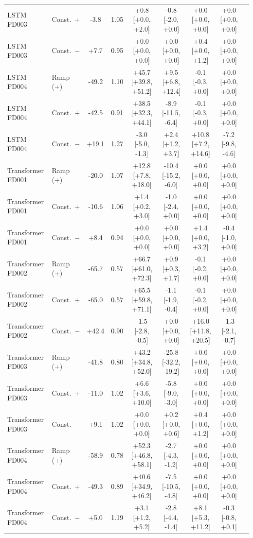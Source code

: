 \documentclass[10pt,a4paper]{article}
\begin{document}
\begin{landscape}
\begin{table}[H]
\begin{tabular}{llccccccc}
LSTM FD003 & Const.\ $+$ & -3.8 & 1.05 & +0.8 [+0.0, +2.0] & -0.8 [-2.0, +0.0] & +0.0 [+0.0, +0.0] & +0.0 [+0.0, +0.0] \\
LSTM FD003 & Const.\ $-$ & +7.7 & 0.95 & +0.0 [+0.0, +0.0] & +0.0 [+0.0, +0.0] & +0.4 [+0.0, +1.2] & +0.0 [+0.0, +0.0] \\
LSTM FD004 & Ramp (+) & -49.2 & 1.10 & +45.7 [+39.8, +51.2] & +9.5 [+6.8, +12.4] & -0.1 [-0.3, +0.0] & +0.0 [+0.0, +0.0] \\
LSTM FD004 & Const.\ $+$ & -42.5 & 0.91 & +38.5 [+32.3, +44.1] & -8.9 [-11.5, -6.4] & -0.1 [-0.3, +0.0] & +0.0 [+0.0, +0.0] \\
LSTM FD004 & Const.\ $-$ & +19.1 & 1.27 & -3.0 [-5.0, -1.3] & +2.4 [+1.2, +3.7] & +10.8 [+7.2, +14.6] & -7.2 [-9.8, -4.6] \\
\midrule
Transformer FD001 & Ramp (+) & -20.0 & 1.07 & +12.8 [+7.8, +18.0] & -10.4 [-15.2, -6.0] & +0.0 [+0.0, +0.0] & +0.0 [+0.0, +0.0] \\
Transformer FD001 & Const.\ $+$ & -10.6 & 1.06 & +1.4 [+0.2, +3.0] & -1.0 [-2.4, +0.0] & +0.0 [+0.0, +0.0] & +0.0 [+0.0, +0.0] \\
Transformer FD001 & Const.\ $-$ & +8.4 & 0.94 & +0.0 [+0.0, +0.0] & +0.0 [+0.0, +0.0] & +1.4 [+0.0, +3.2] & -0.4 [-1.0, +0.0] \\
Transformer FD002 & Ramp (+) & -65.7 & 0.57 & +66.7 [+61.0, +72.3] & +0.9 [+0.3, +1.7] & -0.1 [-0.2, +0.0] & +0.0 [+0.0, +0.0] \\
Transformer FD002 & Const.\ $+$ & -65.0 & 0.57 & +65.5 [+59.8, +71.1] & -1.1 [-1.9, -0.4] & -0.1 [-0.2, +0.0] & +0.0 [+0.0, +0.0] \\
Transformer FD002 & Const.\ $-$ & +42.4 & 0.90 & -1.5 [-2.8, -0.5] & +0.0 [+0.0, +0.0] & +16.0 [+11.8, +20.5] & -1.3 [-2.1, -0.7] \\
Transformer FD003 & Ramp (+) & -41.8 & 0.80 & +43.2 [+34.8, +52.0] & -25.8 [-32.2, -19.2] & +0.0 [+0.0, +0.0] & +0.0 [+0.0, +0.0] \\
Transformer FD003 & Const.\ $+$ & -11.0 & 1.02 & +6.6 [+3.6, +10.0] & -5.8 [-9.0, -3.0] & +0.0 [+0.0, +0.0] & +0.0 [+0.0, +0.0] \\
Transformer FD003 & Const.\ $-$ & +9.1 & 1.02 & +0.0 [+0.0, +0.0] & +0.2 [+0.0, +0.6] & +0.4 [+0.0, +1.2] & +0.0 [+0.0, +0.0] \\
Transformer FD004 & Ramp (+) & -58.9 & 0.78 & +52.3 [+46.8, +58.1] & -2.7 [-4.3, -1.2] & +0.0 [+0.0, +0.0] & +0.0 [+0.0, +0.0] \\
Transformer FD004 & Const.\ $+$ & -49.3 & 0.89 & +40.6 [+34.9, +46.2] & -7.5 [-10.5, -4.8] & +0.0 [+0.0, +0.0] & +0.0 [+0.0, +0.0] \\
Transformer FD004 & Const.\ $-$ & +5.0 & 1.19 & +3.1 [+1.2, +5.2] & -2.8 [-4.4, -1.4] & +8.1 [+5.3, +11.2] & -0.3 [-0.8, +0.1] \\
\bottomrule\end{tabular}
\end{table}
\end{landscape}
\end{document}
